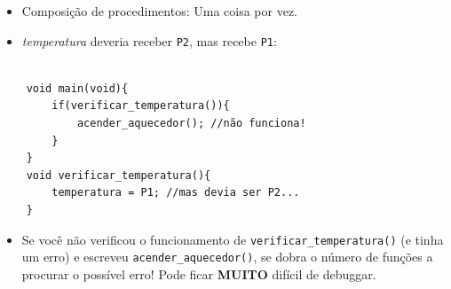 \documentclass[12pt,a4paper,aspectratio=169]{beamer}
\begin{document}
\begin{frame}
	\begin{itemize}
		\item Composição de procedimentos: Uma coisa por vez.
		
		

	\end{itemize}

	\begin{itemize}
	\end{itemize}
\end{frame}

\begin{frame}[fragile]
	\begin{itemize}
			\item \textit{temperatura} deveria receber \texttt{P2}, mas recebe \texttt{P1}:
	\end{itemize}

	\begin{verbatim}
	
	void main(void){
		if(verificar_temperatura()){
			acender_aquecedor(); //não funciona!
		}
	}
	void verificar_temperatura(){
		temperatura = P1; //mas devia ser P2...
	}
	\end{verbatim}
	\begin{itemize}
		\item Se você não verificou o funcionamento de \texttt{verificar\_temperatura()} (e tinha um erro) e escreveu \texttt{acender\_aquecedor()}, se dobra o número de funções a procurar o possível erro! Pode ficar \textbf{MUITO} difícil de debuggar.
	\end{itemize}
\end{frame}
\end{document}
